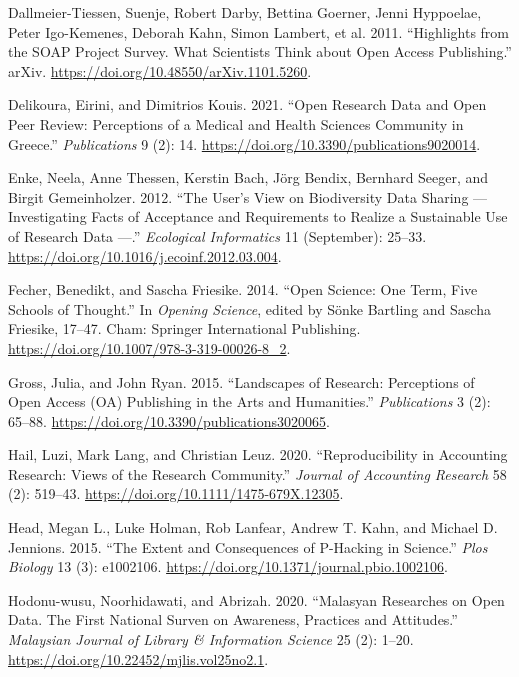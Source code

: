 \documentclass[
  english,
  letterpaper,
]{article}
\newlength{\cslhangindent}
\newenvironment{CSLReferences}[2] %
 {\begin{list}{}{%
  \setlength{\itemindent}{0pt}
  \setlength{\leftmargin}{0pt}
  \setlength{\parsep}{0pt}
  \ifodd #1
   \setlength{\leftmargin}{\cslhangindent}
   \setlength{\itemindent}{-1\cslhangindent}
  \fi
  \setlength{\itemsep}{#2\baselineskip}}}
 {\end{list}}
\begin{document}
\begin{CSLReferences}{1}{0}
Dallmeier-Tiessen, Suenje, Robert Darby, Bettina Goerner, Jenni
Hyppoelae, Peter Igo-Kemenes, Deborah Kahn, Simon Lambert, et al. 2011.
{``Highlights from the {SOAP} Project Survey. {What Scientists Think}
about {Open Access Publishing}.''} arXiv.
\url{https://doi.org/10.48550/arXiv.1101.5260}.

Delikoura, Eirini, and Dimitrios Kouis. 2021. {``Open {Research Data}
and {Open Peer Review}: {Perceptions} of a {Medical} and {Health
Sciences Community} in {Greece}.''} \emph{Publications} 9 (2): 14.
\url{https://doi.org/10.3390/publications9020014}.

Enke, Neela, Anne Thessen, Kerstin Bach, Jörg Bendix, Bernhard Seeger,
and Birgit Gemeinholzer. 2012. {``The User's View on Biodiversity Data
Sharing --- {Investigating} Facts of Acceptance and Requirements to
Realize a Sustainable Use of Research Data ---.''} \emph{Ecological
Informatics} 11 (September): 25--33.
\url{https://doi.org/10.1016/j.ecoinf.2012.03.004}.

Fecher, Benedikt, and Sascha Friesike. 2014. {``Open {Science}: {One
Term}, {Five Schools} of {Thought}.''} In \emph{Opening {Science}},
edited by Sönke Bartling and Sascha Friesike, 17--47. Cham: Springer
International Publishing.
\url{https://doi.org/10.1007/978-3-319-00026-8_2}.

Gross, Julia, and John Ryan. 2015. {``Landscapes of {Research}:
{Perceptions} of {Open Access} ({OA}) {Publishing} in the {Arts} and
{Humanities}.''} \emph{Publications} 3 (2): 65--88.
\url{https://doi.org/10.3390/publications3020065}.

Hail, Luzi, Mark Lang, and Christian Leuz. 2020. {``Reproducibility in
{Accounting Research}: {Views} of the {Research Community}.''}
\emph{Journal of Accounting Research} 58 (2): 519--43.
\url{https://doi.org/10.1111/1475-679X.12305}.

Head, Megan L., Luke Holman, Rob Lanfear, Andrew T. Kahn, and Michael D.
Jennions. 2015. {``The {Extent} and {Consequences} of {P-Hacking} in
{Science}.''} \emph{Plos Biology} 13 (3): e1002106.
\url{https://doi.org/10.1371/journal.pbio.1002106}.

Hodonu-wusu, Noorhidawati, and Abrizah. 2020. {``Malasyan Researches on
Open Data. {The} First National Surven on Awareness, Practices and
Attitudes.''} \emph{Malaysian Journal of Library \& Information Science}
25 (2): 1--20. \url{https://doi.org/10.22452/mjlis.vol25no2.1}.


\end{CSLReferences}
\end{document}
